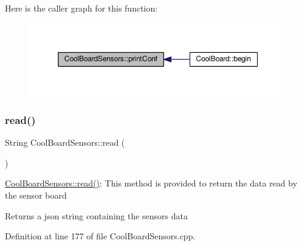Here is the caller graph for this function\+:\nopagebreak
\begin{figure}[H]
\begin{center}
\leavevmode
\includegraphics[width=350pt]{de/d46/class_cool_board_sensors_af6fd79505815b204c178617ecf54c873_icgraph}
\end{center}
\end{figure}
\mbox{\label{class_cool_board_sensors_a91badb2539d91fda8679f2a597874c48}} 
\subsubsection{\texorpdfstring{read()}{read()}}
{\footnotesize\ttfamily String Cool\+Board\+Sensors\+::read (\begin{DoxyParamCaption}{ }\end{DoxyParamCaption})}

\hyperlink{class_cool_board_sensors_a91badb2539d91fda8679f2a597874c48}{Cool\+Board\+Sensors\+::read()}\+: This method is provided to return the data read by the sensor board

\begin{DoxyReturn}{Returns}
a json string containing the sensors data 
\end{DoxyReturn}


Definition at line 177 of file Cool\+Board\+Sensors.\+cpp.


